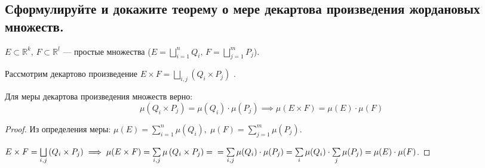 
\subsection{Сформулируйте и докажите теорему о мере декартова произведения жордановых множеств.}
    \begin{theorem}
        $E \subset \mathbb{R}^k, \, F \subset \mathbb{R}^l$ --- простые множества 
        ($E = \bigsqcup\limits_{i=1}^n Q_i, \, F = \bigsqcup\limits_{j=1}^m P_j$).
        
        Рассмотрим декартово произведение $E \times F = \bigsqcup\limits_{i, j} \left( Q_i \times P_j \right)$ .
        
        Для меры декартова произведения множеств верно:
        \[ \mu(Q_i \times P_j) = \mu(Q_i) \cdot \mu(P_j) \implies \mu(E \times F) = \mu(E) \cdot \mu(F) \]
    \end{theorem}
    \begin{proof}
        Из определения меры: 
        $\mu(E) = \sum\limits_{i=1}^n \mu(Q_i), \; \mu(F) = \sum\limits_{j=1}^m \mu(P_j)$.
        
        $E \times F = \bigsqcup\limits_{i, j} \left( Q_i \times P_j \right) \implies \mu(E \times F) 
        = \sum\limits_{i, j} \mu\left( Q_i \times P_j \right) =\\
        = \sum\limits_{i, j} \mu(Q_i) \cdot \mu(P_j) = \sum\limits_{i} \mu(Q_i) \cdot \sum\limits_{j} \mu(P_j) 
        = \mu(E) \cdot \mu(F)$.
    \end{proof}

